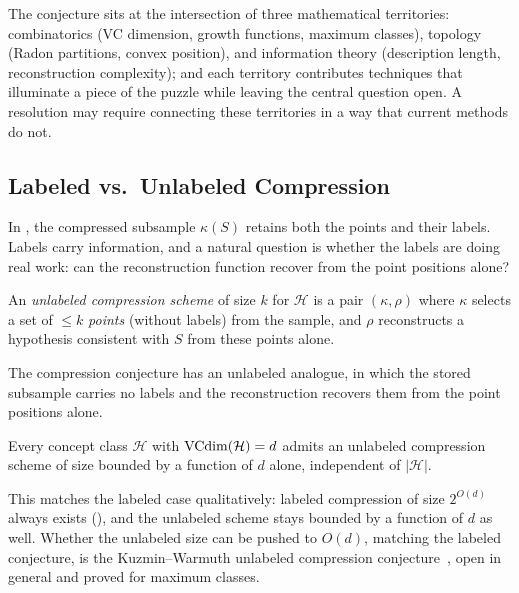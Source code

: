 \begin{obstbox}
\medskip
The conjecture sits at the intersection of three mathematical
territories: combinatorics (VC dimension, growth functions, maximum
classes), topology (Radon partitions, convex position), and
information theory (description length, reconstruction
complexity); and each territory contributes techniques that
illuminate a piece of the puzzle while leaving the central question
open.  A resolution may require connecting these territories in a way
that current methods do not.
\end{obstbox}


\subsection{Labeled vs.\ Unlabeled Compression}
\label{sec:unlabeled-compression}

In , the compressed subsample $\kappa(S)$ retains
both the points and their labels.  Labels carry information, and a natural
question is whether the labels are doing real work: can the reconstruction
function recover from the point positions alone?

\begin{defn}
\label{def:unlabeled-compression}
An \emph{unlabeled compression scheme} of size $k$ for $\mathcal{H}$ is a pair
$(\kappa, \rho)$ where $\kappa$ selects a set of $\leq k$ \emph{points}
(without labels) from the sample, and $\rho$ reconstructs a hypothesis
consistent with $S$ from these points alone.
\end{defn}

The compression conjecture has an unlabeled analogue, in which the stored
subsample carries no labels and the reconstruction recovers them from the point
positions alone.

\begin{thm}
\label{thm:unlabeled-bounded}
Every concept class $\mathcal{H}$ with $\mathrm{VCdim}(\mathcal{H}) = d$ admits an
unlabeled compression scheme of size bounded by a function of $d$ alone,
independent of $|\mathcal{H}|$.
\end{thm}

This matches the labeled case qualitatively: labeled compression of size
$2^{O(d)}$ always exists (), and the unlabeled scheme
stays bounded by a function of $d$ as well.  Whether the unlabeled size can be
pushed to $O(d)$, matching the labeled conjecture, is the Kuzmin--Warmuth
unlabeled compression conjecture~\cite{KuzminWarmuth2007}, open in general and
proved for maximum classes.

